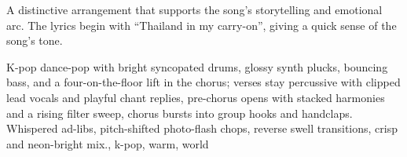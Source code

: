

\begin{notes}
A distinctive arrangement that supports the song's storytelling and emotional arc. %
The lyrics begin with “Thailand in my carry-on”, giving a quick sense of the song’s tone.
\end{notes}

\begin{style}
K-pop dance-pop with bright syncopated drums, glossy synth plucks, bouncing bass, and a four-on-the-floor lift in the chorus; verses stay percussive with clipped lead vocals and playful chant replies, pre-chorus opens with stacked harmonies and a rising filter sweep, chorus bursts into group hooks and handclaps. %
Whispered ad-libs, pitch-shifted photo-flash chops, reverse swell transitions, crisp and neon-bright mix., k-pop, warm, world
\end{style}

